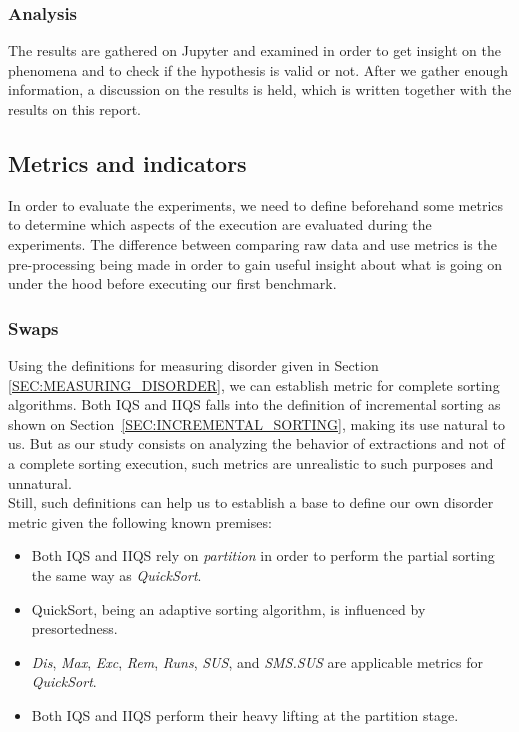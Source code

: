 \subsubsection{Analysis}
The results are gathered on Jupyter and examined in order to get insight on the phenomena and to check if the hypothesis is valid or not. After we gather enough information, a discussion on the results is held, which is written together with the results on this report.\\

\subsection{Metrics and indicators}
In order to evaluate the experiments, we need to define beforehand some metrics to determine which aspects of the execution are evaluated during the experiments. The difference between comparing raw data and use metrics is the pre-processing being made in order to gain useful insight about what is going on under the hood before executing our first benchmark.\\

\subsubsection{Swaps}
Using the definitions for measuring disorder given in Section \ref{SEC:MEASURING_DISORDER}, we can establish metric for complete sorting algorithms. Both IQS and IIQS falls into the definition of incremental sorting as shown on Section~\ref{SEC:INCREMENTAL_SORTING}, making its use natural to us. But as our study consists on analyzing the behavior of extractions and not of a complete sorting execution, such metrics are unrealistic to such purposes and unnatural.\\

Still, such definitions can help us to establish a base to define our own disorder metric given the following known premises:\\

\begin{itemize}
    \item Both IQS and IIQS rely on \textit{partition} in order to perform the partial sorting the same way as \textit{QuickSort}.
    \item QuickSort, being an adaptive sorting algorithm, is influenced by presortedness.
    \item \textit{Dis}, \textit{Max}, \textit{Exc}, \textit{Rem}, \textit{Runs}, \textit{SUS}, and \textit{SMS.SUS} are applicable metrics for \textit{QuickSort}.
    \item Both IQS and IIQS perform their heavy lifting at the partition stage.
\end{itemize}

